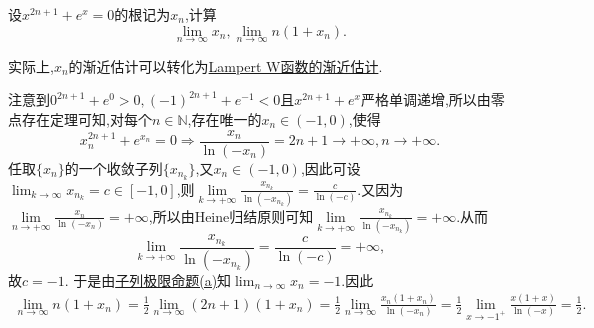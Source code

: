 \documentclass[../../main.tex]{subfiles}%
\begin{document}
\begin{example}
设\(x^{2n + 1}+e^{x}=0\)的根记为\(x_n\),计算
\[
\lim_{n\rightarrow\infty}x_n,\lim_{n\rightarrow\infty}n(1 + x_n).
\]
\end{example}
\begin{note}
实际上,$x_n$的渐近估计可以转化为\hyperref[proposition:Lampert W 函数的渐近估计]{Lampert W函数的渐近估计}.
\end{note}
\begin{solution}
注意到\(0^{2n + 1}+e^{0}>0,(-1)^{2n + 1}+e^{-1}<0\)且\(x^{2n + 1}+e^{x}\)严格单调递增,所以由零点存在定理可知,对每个\(n\in\mathbb{N}\),存在唯一的\(x_n\in(-1,0)\),使得
\[
x_n^{2n + 1}+e^{x_n}=0\Rightarrow\frac{x_n}{\ln(-x_n)} = 2n + 1\rightarrow +\infty,n\to +\infty.
\]
任取$\{x_n\}$的一个收敛子列$\{x_{n_k}\}$,又$x_n\in(-1,0)$,因此可设\(\lim_{k\rightarrow\infty}x_{n_k}=c\in[-1,0]\),则$\underset{k\rightarrow +\infty}{\lim}\frac{x_{n_k}}{\ln \left( -x_{n_k} \right)}=\frac{c}{\ln \left( -c \right)}$.又因为$\underset{n\rightarrow +\infty}{\lim}\frac{x_n}{\ln \left( -x_n \right)}=+\infty$,所以由Heine归结原则可知$\underset{k\rightarrow +\infty}{\lim}\frac{x_{n_k}}{\ln \left( -x_{n_k} \right)}=+\infty$.从而
\[
\underset{k\rightarrow +\infty}{\lim}\frac{x_{n_k}}{\ln \left( -x_{n_k} \right)}=\frac{c}{\ln(-c)}=+\infty,
\]
故$c = - 1$.
于是由\hyperref[proposition:子列极限命题]{子列极限命题(a)}知\(\lim_{n\rightarrow\infty}x_n=-1\).因此
\begin{align*}
\lim_{n\rightarrow\infty}n(1 + x_n)=\frac{1}{2}\lim_{n\rightarrow\infty}(2n + 1)(1 + x_n)
=\frac{1}{2}\lim_{n\rightarrow\infty}\frac{x_n(1 + x_n)}{\ln(-x_n)}
=\frac{1}{2}\lim_{x\rightarrow - 1^+}\frac{x(1 + x)}{\ln(-x)}
=\frac{1}{2}.
\end{align*}

\end{solution}
\end{document}

